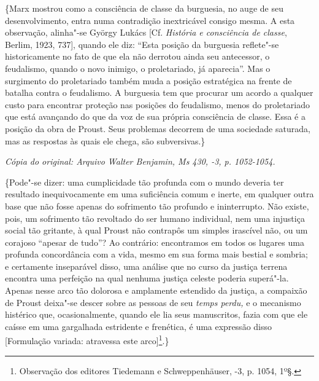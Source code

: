 \{Marx mostrou como a consciência de classe da burguesia, no auge de seu
desenvolvimento, entra numa contradição inextricável consigo mesma. A
esta observação, alinha"-se György Lukács {[}Cf. \emph{História e
consciência de classe}, Berlim, 1923, 737{]}, quando ele diz: ``Esta %
posição da burguesia reflete"-se historicamente no fato de que ela não
derrotou ainda seu antecessor, o feudalismo, quando o novo inimigo, o
proletariado, já aparecia''. Mas o surgimento do proletariado também
muda a posição estratégica na frente de batalha contra o feudalismo. A
burguesia tem que procurar um acordo a qualquer custo para encontrar
proteção nas posições do feudalismo, menos do proletariado que está
avançando do que da voz de sua própria consciência de classe. Essa é a
posição da obra de Proust. Seus problemas decorrem de uma sociedade
saturada, mas as respostas às quais ele chega, são subversivas.\}


\begin{flushright}
\emph{\small{Cópia do original: Arquivo Walter Benjamin, Ms 430, -3, p. 1052-1054.}}
\end{flushright}

\{Pode"-se dizer: uma cumplicidade tão profunda com o mundo deveria ter
resultado inequivocamente em uma suficiência comum e inerte, em qualquer
outra base que não fosse apenas do sofrimento tão profundo e
ininterrupto. Não existe, pois, um sofrimento tão revoltado do ser
humano individual, nem uma injustiça social tão gritante, à qual Proust
não contrapôs um simples irascível não, ou um corajoso ``apesar de
tudo''? Ao contrário: encontramos em todos os lugares uma profunda
concordância com a vida, mesmo em sua forma mais bestial e sombria; e
certamente inseparável disso, uma análise que no curso da justiça
terrena encontra uma perfeição na qual nenhuma justiça celeste poderia
superá"-la. Apenas nesse arco tão dolorosa e amplamente estendido da
justiça, a compaixão de Proust deixa"-se descer sobre as pessoas de seu
\emph{temps perdu,} e o mecanismo histérico que, ocasionalmente, quando
ele lia seus manuscritos, fazia com que ele caísse em uma gargalhada
estridente e frenética, é uma expressão disso {[}Formulação variada:
atravessa este arco{]}\footnote{Observação dos editores Tiedemann e
  Schweppenhäuser, -3, p. 1054, 1º§. \versal{[N. T.]}}.\}

